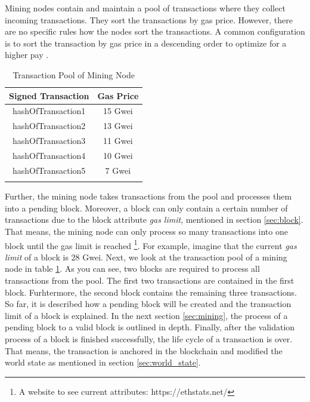Mining nodes contain and maintain a pool of transactions where they collect incoming transactions. They sort the transactions by gas price. However, there are no specific rules how the nodes sort the transactions. A common configuration is to sort the transaction by gas price in a descending order to optimize for a higher pay .

\begin{longtable}{c|c}
	\hline
	Signed Transaction & Gas Price \\
	\hline
	hashOfTransaction1 & 15 Gwei \\
	hashOfTransaction2 & 13 Gwei \\
	hashOfTransaction3 & 11 Gwei \\
	hashOfTransaction4 & 10 Gwei \\
	hashOfTransaction5 & 7 Gwei \\
	\hline
	\caption{Transaction Pool of Mining Node}
	\label{table:sorted_gas_prices}
\end{longtable} 

Further, the mining node takes transactions from the pool and processes them into a pending block. 
Moreover, a block can only contain a certain number of transactions due to the block 
attribute \textit{gas limit}, mentioned in section \ref{sec:block}. 
That means, the mining node can only process so many transactions into one 
block until the gas limit is reached \footnote{A website to see 
current attributes: https://ethstats.net/}. For example, 
imagine that the current \textit{gas limit} of a block is 28 Gwei. 
Next, we look at the transaction pool of a mining node in 
table \ref{table:sorted_gas_prices}. As you can see, two blocks are 
required to process all transactions from the pool. The first two transactions 
are contained in the first block. Furhtermore, the second block contains the remaining 
three transactions. 
So far, it is described how a pending block will be created and the transaction 
limit of a block is explained. In the next section \ref{sec:mining}, 
the process of a pending block to a valid block is outlined in depth. 
Finally, after the validation process of a block is finished successfully, 
the life cycle of a transaction is over. That means, the transaction is anchored 
in the blockchain and modified the world state as mentioned in section \ref{sec:world_state}.

